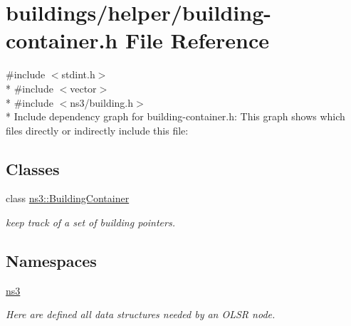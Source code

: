 \hypertarget{building-container_8h}{}\section{buildings/helper/building-\/container.h File Reference}
\label{building-container_8h}
{\ttfamily \#include $<$stdint.\+h$>$}\\*
{\ttfamily \#include $<$vector$>$}\\*
{\ttfamily \#include $<$ns3/building.\+h$>$}\\*
Include dependency graph for building-\/container.h\+:
This graph shows which files directly or indirectly include this file\+:
\subsection*{Classes}
\begin{DoxyCompactItemize}
\item 
class \hyperlink{classns3_1_1BuildingContainer}{ns3\+::\+Building\+Container}
\begin{DoxyCompactList}\small\item\em keep track of a set of building pointers. \end{DoxyCompactList}\end{DoxyCompactItemize}
\subsection*{Namespaces}
\begin{DoxyCompactItemize}
\item 
 \hyperlink{namespacens3}{ns3}
\begin{DoxyCompactList}\small\item\em Here are defined all data structures needed by an O\+L\+SR node. \end{DoxyCompactList}\end{DoxyCompactItemize}
